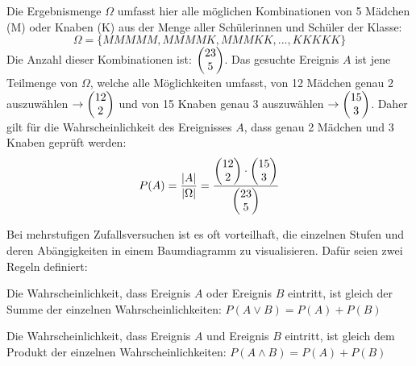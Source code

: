 Die Ergebnismenge $\Omega$ umfasst hier alle m\"{o}glichen Kombinationen von 5 M\"{a}dchen (M) oder Knaben (K) aus der Menge aller Sch\"{u}lerinnen und Sch\"{u}ler der Klasse: $$\Omega = \{ MMMMM, MMMMK, MMMKK, ..., KKKKK\}$$ Die Anzahl dieser Kombinationen ist: $\begin{pmatrix}23 \\ 5\end{pmatrix}$. Das gesuchte Ereignis $A$ ist jene Teilmenge von $\Omega$, welche alle M\"{o}glichkeiten umfasst, von 12 M\"{a}dchen genau 2 auszuw\"{a}hlen $\rightarrow \begin{pmatrix}12 \\ 2\end{pmatrix}$ und von 15 Knaben genau 3 auszuw\"{a}hlen $\rightarrow \begin{pmatrix}15 \\ 3\end{pmatrix}$. Daher gilt f\"{u}r die Wahrscheinlichkeit des Ereignisses $A$, dass genau 2 M\"{a}dchen und 3 Knaben gepr\"{u}ft werden: $$P(A) = \frac{|A|}{|\Omega|} = \frac{\begin{pmatrix}12 \\ 2\end{pmatrix} \cdot \begin{pmatrix}15 \\ 3\end{pmatrix}}{\begin{pmatrix}23 \\ 5\end{pmatrix}}$$

\pagebreak


Bei mehrstufigen Zufallsversuchen ist es oft vorteilhaft, die einzelnen Stufen und deren Ab\"{a}ngigkeiten in einem Baumdiagramm zu visualisieren. Daf\"{u}r seien zwei Regeln definiert:

\begin{enumerate}
	 Die Wahrscheinlichkeit, dass Ereignis $A$ oder Ereignis $B$ eintritt, ist gleich der Summe der einzelnen Wahrscheinlichkeiten: $P(A \lor B) = P(A) + P(B)$

	 Die Wahrscheinlichkeit, dass Ereignis $A$ und Ereignis $B$ eintritt, ist gleich dem Produkt der einzelnen Wahrscheinlichkeiten: $P(A \land B) = P(A) + P(B)$
\end{enumerate}


